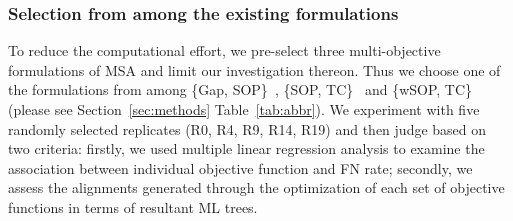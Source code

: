 \subsubsection{Selection from among the existing formulations}
\label{sec:existing_msa_formulation}
To reduce the computational effort, we pre-select three multi-objective formulations of MSA and limit our investigation thereon. Thus we choose one of the formulations from among \{Gap, SOP\}~\citep{abbasi2015local}, \{SOP, TC\}~\citep{da2010alineaga} and \{wSOP, TC\}~\citep{rubio2016hybrid} (please see Section~\ref{sec:methods} Table~\ref{tab:abbr}). We experiment with five randomly selected replicates (R0, R4, R9, R14, R19) and then judge based on two criteria: firstly, we used multiple linear regression analysis to examine the association between individual objective function and FN rate; secondly, we assess the alignments generated through the optimization of each set of objective functions in terms of resultant ML trees. 

